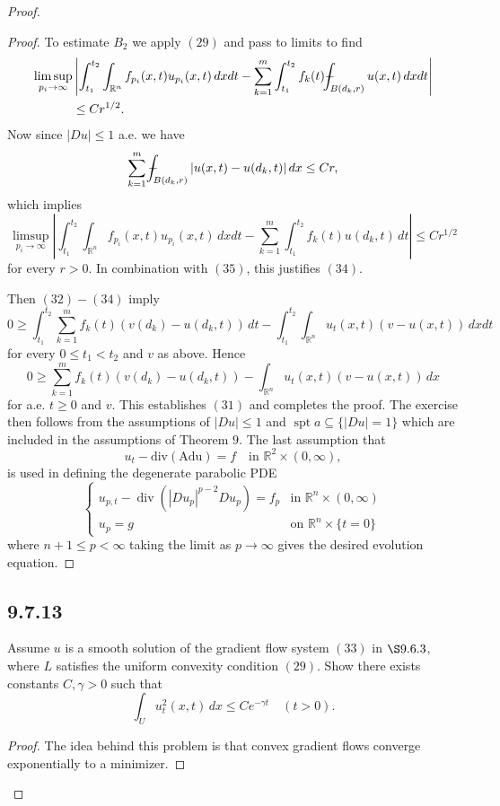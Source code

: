 \documentclass{article}
\def\Xint#1{\mathchoice
{\XXint\displaystyle\textstyle{#1}}%
{\XXint\textstyle\scriptstyle{#1}}%
{\XXint\scriptstyle\scriptscriptstyle{#1}}%
{\XXint\scriptscriptstyle\scriptscriptstyle{#1}}%
\!\int}
\def\XXint#1#2#3{{\setbox0=\hbox{$#1{#2#3}{\int}$ }
\vcenter{\hbox{$#2#3$ }}\kern-.6\wd0}}
\def\dashint{\Xint-}
\begin{document}
\begin{flushleft}
\begin{proof}
\begin{proof}
To estimate $B_2$ we apply $(29)$ and pass to limits to find
\begin{align*}\limsup_{p_i\to\infty}&\left|\int_{t_1}^{t_2}\int_{\mathbb R^n} f_{p_i}(x,t)u_{p_i}(x,t)\,dxdt - \sum_{k=1}^m\int_{t_1}^{t_2} f_k(t) \dashint_{B(d_k,r)}u(x,t)\,dxdt\right|
\\&\leq Cr^{1/2}.
\end{align*}
Now since $|Du|\leq 1$ a.e. we have
$$\sum_{k=1}^m \dashint_{B(d_k,r)}|u(x,t)-u(d_k,t)|\,dx \leq Cr,$$
which implies
$$\limsup_{p_i\to\infty}\left|\int_{t_1}^{t_2}\int_{\mathbb R^n} f_{p_i}(x,t)u_{p_i}(x,t)\,dxdt - \sum_{k=1}^m\int_{t_1}^{t_2} f_k(t)u(d_k,t)\,dt\right|\leq Cr^{1/2}$$
for every $r>0$. In combination with $(35)$, this justifies $(34)$. 

Then $(32)-(34)$ imply
$$0 \geq \int_{t_1}^{t_2} \sum_{k=1}^m f_k(t) (v(d_k)-u(d_k,t))\,dt -\int_{t_1}^{t_2}\int_{\mathbb R^n} u_t(x,t) (v-u(x,t))\,dxdt$$
for every $0\leq t_1 < t_2$ and $v$ as above. Hence
$$0 \geq \sum_{k=1}^m f_k(t) (v(d_k)-u(d_k,t)) -\int_{\mathbb R^n} u_t(x,t) (v-u(x,t))\,dx$$
for a.e. $t\geq 0$ and $v$. This establishes $(31)$ and completes the proof. The exercise then follows from the assumptions of $|Du|\leq 1$ and $\operatorname{spt}a \subseteq \{|Du|=1\}$ which are included in the assumptions of Theorem $9$. The last assumption that 
$$u_t - \operatorname{div(Adu)}=f \quad \text{in  $\mathbb R^2 \times (0,\infty)$},$$
is used in defining the degenerate parabolic PDE
$$\begin{cases}
u_{p,t} - \operatorname{div}(|Du_p|^{p-2}Du_p)=f_p &\text{in $\mathbb R^n \times (0,\infty)$} \\
u_p = g & \text{on $\mathbb R^n \times \{t=0\}$}
\end{cases}$$
where $n+1\leq p < \infty$ taking the limit as $p\to\infty$ gives the desired evolution equation.
\end{proof}
\subsection{\textbf{9.7.13}} Assume $u$ is a smooth solution of the gradient flow system $(33)$ in $\S 9.6.3$, where $L$ satisfies the uniform convexity condition $(29)$. Show there exists constants $C,\gamma > 0$ such that
$$\int_U u^2_t(x,t) \,dx \leq Ce^{-\gamma t}\quad (t>0).$$
\begin{proof}

The idea behind this problem is that convex gradient flows converge exponentially to a minimizer.


\end{proof}
\end{proof}
\end{flushleft}
\end{document}
